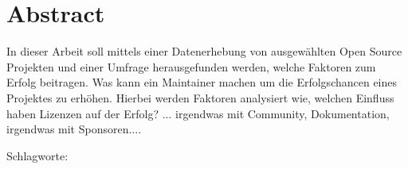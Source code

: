 \chapter*{Abstract}
\thispagestyle{empty}

In dieser Arbeit soll mittels einer Datenerhebung von ausgewählten Open Source Projekten und einer 
Umfrage herausgefunden werden, welche Faktoren zum Erfolg beitragen.
Was kann ein Maintainer machen um die Erfolgschancen eines Projektes zu erhöhen. Hierbei werden 
Faktoren analysiert wie, welchen Einfluss haben Lizenzen auf der Erfolg? ... irgendwas mit Community,
Dokumentation, irgendwas mit Sponsoren....


\bigskip

\noindent
Schlagworte: 

